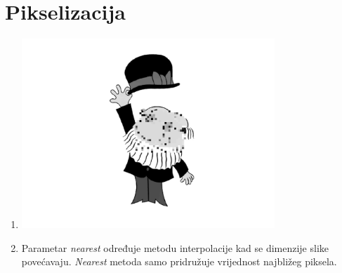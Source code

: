 \documentclass[12pt, a4]{report}
\begin{document}
        \section{Pikselizacija}
            \begin{enumerate}
                \item
                    \begin{minipage}{\linewidth}
                        \centering
                        \includegraphics[width=0.75\textwidth]{baltazar}
                    \end{minipage}
                \item
                    Parametar {\it nearest} određuje metodu interpolacije kad se dimenzije slike povećavaju.
                    {\it Nearest} metoda samo pridružuje vrijednost najbližeg piksela.
            \end{enumerate}
\end{document}
